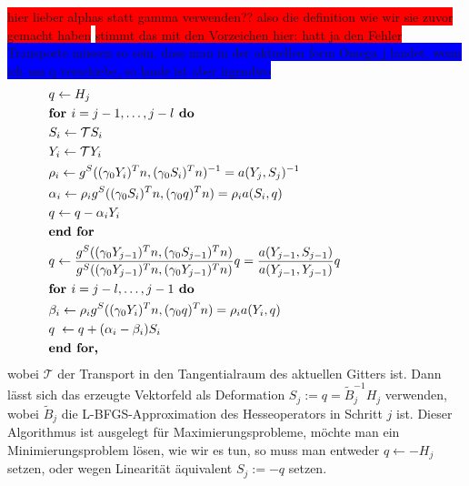 \begin{defi}
\colorbox{red}{hier lieber alphas statt gamma verwenden?? also die definition wie wir sie zuvor gemacht haben}
\colorbox{red}{stimmt das mit den Vorzeichen hier: hatt ja den Fehler}
\colorbox{blue}{Transporte müssen so sein, dass man in der aktuellen form Omega j landet, wenn ich um q verschiebe, so lande ist aber irgendwo}
\begin{equation} 
\label{2loopbfgs}
\begin{aligned}
&	\hspace{-2.3cm}	q \leftarrow H_j \\
&	\hspace{-2.3cm} \textbf{for } i = j - 1, \dots, j - l \textbf{ do} \\
&	\hspace{-2.3cm} 	S_i \leftarrow \mathcal{T} S_i \\
&	\hspace{-2.3cm} 	Y_i \leftarrow \mathcal{T} Y_i \\
&	\hspace{-2.3cm} 	\rho_i \leftarrow g^S((\gamma_0 Y_i)^Tn, (\gamma_0 S_i)^Tn)^{-1} = a(Y_j, S_j)^{-1} \\
&	\hspace{-2.3cm} 	\alpha_i \leftarrow \rho_i g^S((\gamma_0 S_i)^Tn, (\gamma_0 q)^T n) = \rho_i a(S_i, q) \\
&	\hspace{-2.3cm}		q \leftarrow q - \alpha_i Y_i \\
&	\hspace{-2.3cm}     \textbf{end for} \\
&	\hspace{-2.3cm}     q \leftarrow \frac{g^S((\gamma_0 Y_{j-1})^Tn, (\gamma_0 S_{j-1})^Tn)}{g^S((\gamma_0 Y_{j-1})^Tn, (\gamma_0 Y_{j-1})^Tn)}q = \frac{a(Y_{j-1}, S_{j-1})}{a(Y_{j-1}, Y_{j-1})}q \\	
&	\hspace{-2.3cm}     \textbf{for } i = j - l, \dots, j - 1 \textbf{ do} \\
&	\hspace{-2.3cm}   	\beta_i \leftarrow \rho_i g^S((\gamma_0 Y_i)^Tn, (\gamma_0 q)^Tn) = \rho_i a(Y_i, q) \\
&	\hspace{-2.3cm}   	q \;\leftarrow q + (\alpha_i - \beta_i)S_i \\
&	\hspace{-2.3cm}  	\textbf{end for,}
\end{aligned}
\end{equation}
	wobei $\mathcal{T}$ der Transport in den Tangentialraum des aktuellen Gitters ist. Dann lässt sich das erzeugte Vektorfeld als Deformation $S_j := q = \tilde{B}_j^{-1}H_j$ verwenden, wobei $\tilde{B}_j$ die L-BFGS-Approximation des Hesseoperators in Schritt $j$ ist. Dieser Algorithmus ist ausgelegt für Maximierungsprobleme, möchte man ein Minimierungsproblem lösen, wie wir es tun, so muss man entweder $q \leftarrow -H_j$ setzen, oder wegen Linearität äquivalent \newline $S_j := -q$ setzen.
\end{defi}

